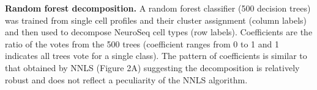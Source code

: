 \textbf{Random forest decomposition. }
A random forest classifier (500 decision trees) was trained from single cell profiles and their cluster assignment (column labels) and then used to decompose NeuroSeq cell types (row labels). Coefficients are the ratio of the votes from the 500 trees (coefficient ranges from 0 to 1 and 1 indicates all trees vote for a single class). The pattern of coefficients is similar to that obtained by NNLS (Figure 2A) suggesting the decomposition is relatively robust and does not reflect a peculiarity of the NNLS algorithm.
